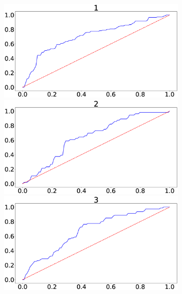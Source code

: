 \documentclass[journal]{IEEEtran}
\providecommand{\DIFaddtex}[1]{{\protect\color{blue}\uwave{#1}}} %
\providecommand{\DIFaddFL}[1]{\DIFadd{#1}} %
\providecommand{\DIFaddbeginFL}{} %
\providecommand{\DIFaddendFL}{} %
\providecommand{\DIFdelbeginFL}{} %
\providecommand{\DIFdelendFL}{} %
\providecommand{\DIFadd}[1]{\texorpdfstring{\DIFaddtex{#1}}{#1}} %
\newcommand{\DIFscaledelfig}{0.5}
\newlength{\DIFdelgraphicswidth} %
\newlength{\DIFdelgraphicsheight} %
\newcommand{\DIFaddincludegraphics}[2][]{{\color{blue}\fbox{\DIFOincludegraphics[#1]{#2}}}} %
\newcommand{\DIFdelincludegraphics}[2][]{%
\sbox{\DIFdelgraphicsbox}{\DIFOincludegraphics[#1]{#2}}%
\settoboxwidth{\DIFdelgraphicswidth}{\DIFdelgraphicsbox} %
\settoboxtotalheight{\DIFdelgraphicsheight}{\DIFdelgraphicsbox} %
\scalebox{\DIFscaledelfig}{%
\parbox[b]{\DIFdelgraphicswidth}{\usebox{\DIFdelgraphicsbox}\\[-\baselineskip] \rule{\DIFdelgraphicswidth}{0em}}\llap{\resizebox{\DIFdelgraphicswidth}{\DIFdelgraphicsheight}{%
\setlength{\unitlength}{\DIFdelgraphicswidth}%
\begin{picture}(1,1)%
\thicklines\linethickness{2pt} %
{\color[rgb]{1,0,0}\put(0,0){\framebox(1,1){}}}%
{\color[rgb]{1,0,0}\put(0,0){\line( 1,1){1}}}%
{\color[rgb]{1,0,0}\put(0,1){\line(1,-1){1}}}%
\end{picture}%
}\hspace*{3pt}}} %
} %
\DeclareRobustCommand{\DIFaddbeginFL}{\DIFOaddbeginFL \let\includegraphics\DIFaddincludegraphics} %
\DeclareRobustCommand{\DIFaddendFL}{\DIFOaddendFL \let\includegraphics\DIFOincludegraphics} %
\DeclareRobustCommand{\DIFdelbeginFL}{\DIFOdelbeginFL \let\includegraphics\DIFdelincludegraphics} %
\DeclareRobustCommand{\DIFdelendFL}{\DIFOaddendFL \let\includegraphics\DIFOincludegraphics} %
\begin{document}
{{\begin{figure}[h!]
\captionsetup[subfigure]{justification=centering}
\DIFdelbeginFL %
\DIFdelendFL \DIFaddbeginFL \begin{subfigure}{0.5\textwidth}
\DIFaddendFL \centering
\DIFdelbeginFL %
\DIFdelendFL \DIFaddbeginFL \includegraphics[scale=0.09]{revisedimages/roc_1.eps}   \DIFaddFL{\hspace{-1.5em}
}\includegraphics[scale=0.09]{revisedimages/roc_2.eps} \\
\DIFaddendFL \centering
\DIFdelbeginFL %
\DIFdelendFL \DIFaddbeginFL \includegraphics[scale=0.09]{revisedimages/roc_3.eps}   \DIFaddFL{\hspace{-1.5em}
}
\end{subfigure}
\end{figure}}}
\end{document}
